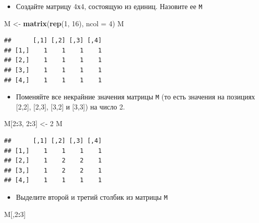 \documentclass[]{book}
\newenvironment{Shaded}{\begin{snugshade}}{\end{snugshade}}
\newcommand{\KeywordTok}[1]{\textcolor[rgb]{0.13,0.29,0.53}{\textbf{#1}}}
\newcommand{\DataTypeTok}[1]{\textcolor[rgb]{0.13,0.29,0.53}{#1}}
\newcommand{\DecValTok}[1]{\textcolor[rgb]{0.00,0.00,0.81}{#1}}
\newcommand{\StringTok}[1]{\textcolor[rgb]{0.31,0.60,0.02}{#1}}
\newcommand{\OperatorTok}[1]{\textcolor[rgb]{0.81,0.36,0.00}{\textbf{#1}}}
\newcommand{\NormalTok}[1]{#1}
\providecommand{\tightlist}{%
  \setlength{\itemsep}{0pt}\setlength{\parskip}{0pt}}
\begin{document}
\begin{itemize}
\tightlist
\item
  Создайте матрицу 4х4, состоящую из единиц. Назовите ее \texttt{M}
\end{itemize}

\begin{Shaded}
\begin{Highlighting}[]
\NormalTok{M <-}\StringTok{ }\KeywordTok{matrix}\NormalTok{(}\KeywordTok{rep}\NormalTok{(}\DecValTok{1}\NormalTok{, }\DecValTok{16}\NormalTok{), }\DataTypeTok{ncol =} \DecValTok{4}\NormalTok{)}
\NormalTok{M}
\end{Highlighting}
\end{Shaded}

\begin{verbatim}
##      [,1] [,2] [,3] [,4]
## [1,]    1    1    1    1
## [2,]    1    1    1    1
## [3,]    1    1    1    1
## [4,]    1    1    1    1
\end{verbatim}

\begin{itemize}
\tightlist
\item
  Поменяйте все некрайние значения матрицы \texttt{M} (то есть значения
  на позициях {[}2,2{]}, {[}2,3{]}, {[}3,2{]} и {[}3,3{]}) на число 2.
\end{itemize}

\begin{Shaded}
\begin{Highlighting}[]
\NormalTok{M[}\DecValTok{2}\OperatorTok{:}\DecValTok{3}\NormalTok{, }\DecValTok{2}\OperatorTok{:}\DecValTok{3}\NormalTok{] <-}\StringTok{ }\DecValTok{2}
\NormalTok{M}
\end{Highlighting}
\end{Shaded}

\begin{verbatim}
##      [,1] [,2] [,3] [,4]
## [1,]    1    1    1    1
## [2,]    1    2    2    1
## [3,]    1    2    2    1
## [4,]    1    1    1    1
\end{verbatim}

\begin{itemize}
\tightlist
\item
  Выделите второй и третий столбик из матрицы \texttt{M}
\end{itemize}

\begin{Shaded}
\begin{Highlighting}[]
\NormalTok{M[,}\DecValTok{2}\OperatorTok{:}\DecValTok{3}\NormalTok{]}
\end{Highlighting}
\end{Shaded}
\end{document}
